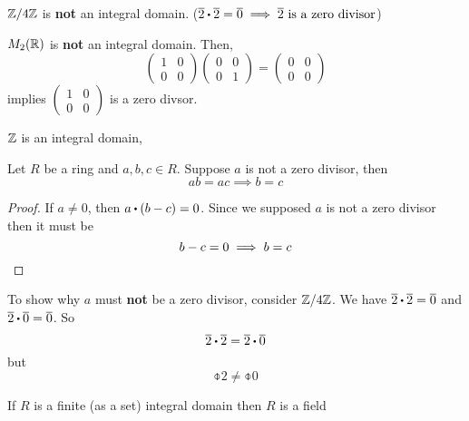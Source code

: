 \documentclass[../Main.tex]{subfiles}
\begin{document}
\begin{example}
	$\mathbb{Z}/4\mathbb{Z}$ is \textbf{not} an integral domain. ($\obar{2}\rdot \obar{2}=\obar{0}\implies \obar{2} \textrm{ is a zero divisor}$)
\end{example}
\begin{example}
	$M_2(\mathbb{R})$ is \textbf{not} an integral domain. Then,
	\[\begin{pmatrix}
	1&0\\0&0
	\end{pmatrix}\begin{pmatrix}
	0&0\\0&1
	\end{pmatrix}=\begin{pmatrix}
	0&0\\0&0
	\end{pmatrix}\]
	implies $\begin{pmatrix}
	1&0\\0&0
	\end{pmatrix}$ is a zero divsor.
\end{example}
\begin{example}
	$\mathbb{Z}$ is an integral domain,
\end{example}
\begin{prop}[title=Cancellation Law,label=cancel]
	Let $R$ be a ring and $a,b,c\in R$.\newline
	Suppose $a$ is not a zero divisor, then
		\[ab=ac\implies b=c\]
\end{prop}
\begin{proof}
	If $a\ne0$, then $a\rdot (b-c)=0$. Since we supposed $a$ is not a zero divisor then it must be
	\[b-c=0 \implies b=c\qedhere\]
\end{proof}
\begin{example}
	To show why $a$ must \textbf{not} be a zero divisor, consider $\mathbb{Z}/4\mathbb{Z}$. We have $\obar{2}\rdot \obar{2}=\obar{0}$ and $\obar{2}\rdot \obar{0}=\obar{0}$. So
	\[\obar{2}\rdot \obar{2}=\obar{2}\rdot \obar{0}\]
	but
	\[\obar{2}\ne \obar{0}\]
\end{example}
\begin{crl}[title = Finite integral domain is field]
	If $R$ is a finite (as a set) integral domain then $R$ is a field
\end{crl}
\end{document}
